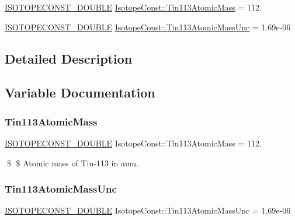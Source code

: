 \begin{DoxyCompactItemize}
\item 
\mbox{\hyperlink{group___isotope_const-_macros_ga8f45a7272ce02c0b4c65c44636ed719a}{I\+S\+O\+T\+O\+P\+E\+C\+O\+N\+S\+T\+\_\+\+D\+O\+U\+B\+LE}} \mbox{\hyperlink{group___isotope_const-_tin-_sn113_ga1561f0755452b5f9af889eda7845d997}{Isotope\+Const\+::\+Tin113\+Atomic\+Mass}} = 112.
\item 
\mbox{\hyperlink{group___isotope_const-_macros_ga8f45a7272ce02c0b4c65c44636ed719a}{I\+S\+O\+T\+O\+P\+E\+C\+O\+N\+S\+T\+\_\+\+D\+O\+U\+B\+LE}} \mbox{\hyperlink{group___isotope_const-_tin-_sn113_gac73714007d08e6784b3bd0cc22af9454}{Isotope\+Const\+::\+Tin113\+Atomic\+Mass\+Unc}} = 1.\+69e-\/06
\end{DoxyCompactItemize}


\subsection{Detailed Description}


\subsection{Variable Documentation}
\mbox{\label{group___isotope_const-_tin-_sn113_ga1561f0755452b5f9af889eda7845d997}} 
\subsubsection{\texorpdfstring{Tin113\+Atomic\+Mass}{Tin113AtomicMass}}
{\footnotesize\ttfamily \mbox{\hyperlink{group___isotope_const-_macros_ga8f45a7272ce02c0b4c65c44636ed719a}{I\+S\+O\+T\+O\+P\+E\+C\+O\+N\+S\+T\+\_\+\+D\+O\+U\+B\+LE}} Isotope\+Const\+::\+Tin113\+Atomic\+Mass = 112.}

\$ \$ Atomic mass of Tin-\/113 in amu. \mbox{\label{group___isotope_const-_tin-_sn113_gac73714007d08e6784b3bd0cc22af9454}} 
\subsubsection{\texorpdfstring{Tin113\+Atomic\+Mass\+Unc}{Tin113AtomicMassUnc}}
{\footnotesize\ttfamily \mbox{\hyperlink{group___isotope_const-_macros_ga8f45a7272ce02c0b4c65c44636ed719a}{I\+S\+O\+T\+O\+P\+E\+C\+O\+N\+S\+T\+\_\+\+D\+O\+U\+B\+LE}} Isotope\+Const\+::\+Tin113\+Atomic\+Mass\+Unc = 1.\+69e-\/06}

